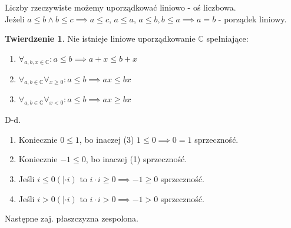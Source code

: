 \documentclass{article}
\theoremstyle{definition}
\theoremstyle{definition}
\newtheorem{tw}{Twierdzenie}[subsection]
\theoremstyle{definition}
\theoremstyle{definition}
\begin{document}
Liczby rzeczywiste możemy uporządkować liniowo - oś liczbowa.\\
Jeżeli $a\leq b \land b\leq c \implies a\leq c$, $a\leq a$, $a\leq b, b\leq a \implies a=b$ - porządek liniowy.

\begin{tw}
    Nie istnieje liniowe uporządkowanie $\mathbb{C}$ spełniające:
    \begin{enumerate}
        \item $\forall_{a,b,x\in\mathbb{C}}: a\leq b \implies a+x \leq b+x$
        \item $\forall_{a,b\in\mathbb{C}} \forall_{x\geq0}: a\leq b \implies ax \leq bx$
        \item $\forall_{a,b\in\mathbb{C}} \forall_{x<0}: a\leq b \implies ax \geq bx$
    \end{enumerate}
    D-d. 
    \begin{enumerate}
        \item Koniecznie $0\leq 1$, bo inaczej (3) $1\leq0\implies0=1$ sprzeczność.
        \item Koniecznie $-1\leq 0$, bo inaczej (1) sprzeczność.
        \item Jeśli $i\leq 0 (|\cdot i)$ to $i\cdot i \geq 0 \implies -1 \geq 0$ sprzeczność.
        \item Jeśli $i> 0 (|\cdot i)$ to $i\cdot i > 0 \implies -1 > 0$ sprzeczność.
    \end{enumerate}
\end{tw}

Następne zaj. płaszczyzna zespolona.
\end{document}

